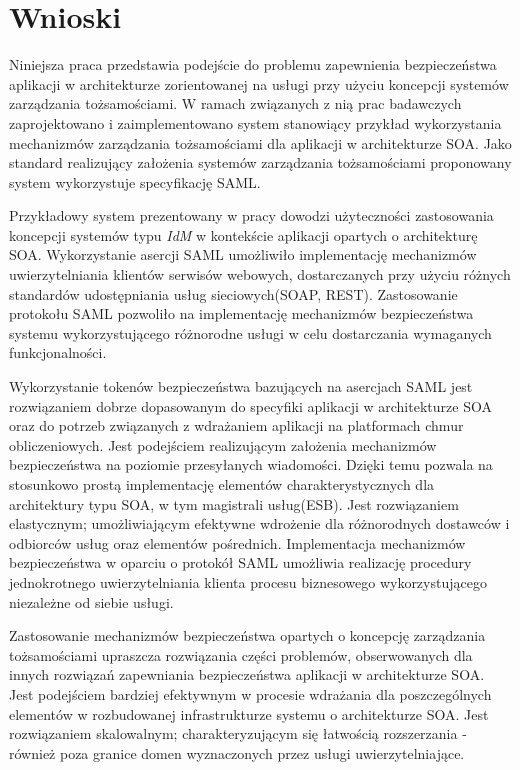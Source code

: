 \chapter{Wnioski}
\label{cha:wnioski}

Niniejsza praca przedstawia podejście do problemu zapewnienia bezpieczeństwa aplikacji w architekturze zorientowanej na usługi przy użyciu koncepcji systemów zarządzania tożsamościami. W ramach związanych z nią prac badawczych zaprojektowano i zaimplementowano system stanowiący przykład wykorzystania mechanizmów zarządzania tożsamościami dla aplikacji w architekturze SOA. Jako standard realizujący założenia systemów zarządzania tożsamościami proponowany system wykorzystuje specyfikację SAML. 

Przykładowy system prezentowany w pracy dowodzi użyteczności zastosowania koncepcji systemów typu \textit{IdM} w kontekście aplikacji opartych o architekturę SOA. Wykorzystanie asercji SAML umożliwiło implementację mechanizmów uwierzytelniania klientów serwisów webowych, dostarczanych przy użyciu różnych standardów udostępniania usług sieciowych(SOAP, REST). Zastosowanie protokołu SAML pozwoliło na implementację mechanizmów bezpieczeństwa systemu wykorzystującego różnorodne usługi w celu dostarczania wymaganych funkcjonalności. 

Wykorzystanie tokenów bezpieczeństwa bazujących na asercjach SAML jest rozwiązaniem dobrze dopasowanym do specyfiki aplikacji w architekturze SOA oraz do potrzeb związanych z wdrażaniem aplikacji na platformach chmur obliczeniowych. Jest podejściem realizującym założenia mechanizmów bezpieczeństwa na poziomie przesyłanych wiadomości. Dzięki temu pozwala na stosunkowo prostą implementację elementów charakterystycznych dla architektury typu SOA, w tym magistrali usług(ESB). Jest rozwiązaniem elastycznym; umożliwiającym efektywne wdrożenie dla różnorodnych dostawców i odbiorców usług oraz elementów pośrednich. Implementacja mechanizmów bezpieczeństwa w oparciu o protokół SAML umożliwia realizację procedury jednokrotnego uwierzytelniania klienta procesu biznesowego wykorzystującego niezależne od siebie usługi.

Zastosowanie mechanizmów bezpieczeństwa opartych o koncepcję zarządzania tożsamościami upraszcza rozwiązania części problemów, obserwowanych dla innych rozwiązań zapewniania bezpieczeństwa aplikacji w architekturze SOA. Jest podejściem bardziej efektywnym w procesie wdrażania dla poszczególnych elementów w rozbudowanej infrastrukturze systemu o architekturze SOA. Jest rozwiązaniem skalowalnym; charakteryzującym się łatwością rozszerzania - również poza granice domen wyznaczonych przez usługi uwierzytelniające.
